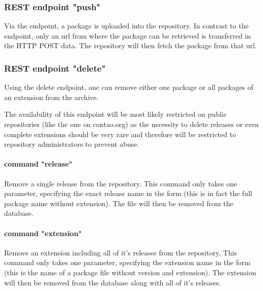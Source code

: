 \subsubsection[sec:repository rest api endpoint push]{REST endpoint "push"}

Via the  endpoint, a package is uploaded into the repository. In contrast to the  endpoint, only an url from where the package can be retrieved is transferred in the HTTP POST data. The repository will then fetch the package from that url.

\subsubsection[sec:repository rest api endpoint delete]{REST endpoint "delete"}

Using the delete endpoint, one can remove either one package or all packages of an extension from the archive.

The availability of this endpoint will be most likely restricted on public repositories (like the one on contao.org) as the necessity to delete releases or even complete extensions should be very rare and therefore will be restricted to repository administrators to prevent abuse.

\paragraph{command "release"}
Remove a single release from the repository. This command only takes one parameter, specifying the exact release name in the form  (this is in fact the full package name without extension). The file will then be removed from the database.


\paragraph{command "extension"}
Remove an extension including all of it's releases from the repository. This command only takes one parameter, specifying the extension name in the form  (this is the name of a package file without version and extension). The extension will then be removed from the database along with all of it's releases.

